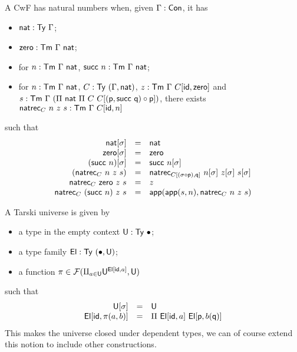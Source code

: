 A \acrshort{CwF} has natural numbers when, given \(\Gamma : \mathsf{Con}\), it has
\begin{itemize}
  \item \(\mathsf{nat} : \mathsf{Ty}\ \Gamma\);
  \item \(\czero : \CTm\ \Ga\ \nat\);
  \item for \(n : \mathsf{Tm}\ \Gamma\ \mathsf{nat}\), \(\mathsf{succ}\ n : \mathsf{Tm}\ \Gamma\ \mathsf{nat}\);
  \item for \(n : \mathsf{Tm}\ \Gamma\ \mathsf{nat}\), \(C : \mathsf{Ty}\ (\Gamma, \mathsf{nat})\),
  \(z : \mathsf{Tm}\ \Gamma\ C[\mathsf{id}, \mathsf{zero}]\) and
  \(s : \CTm\ \Ga\ (\Pi\ \nat\ \Pi\ C\ C[(\pp, \csucc\ \pq) \circ \pp])\),
  there exists \(\mathsf{natrec}_C\ n\ z\ s : \mathsf{Tm}\ \Gamma\ C[\mathsf{id}, n]\)
\end{itemize}
such that
\[
  \begin{array}{rcl}
    \nat[\sigma] &=& \nat \\
    \czero[\sigma] &=& \czero \\
    (\csucc\ n)[\sigma] &=& \csucc\ n[\sigma] \\
    (\natrec_C\ n\ z\ s) &=&
    \natrec_{C[(\sigma \circ \pp), \pq]}\ n[\sigma]\ z[\sigma]\ s[\sigma] \\
    \natrec_C\ \czero\ z\ s &=& z \\
    \natrec_C\ (\csucc\ n)\ z\ s &=& \capp(\capp(s,n), \natrec_C\ n\ z\ s)
  \end{array}
\]


A Tarski universe is given by
\begin{itemize}
  \item a type in the empty context \(\mathsf{U} : \mathsf{Ty}\ \bullet\);
  \item a type family \(\mathsf{El} : \mathsf{Ty}\ (\bullet, \mathsf{U})\);
  \item a function
  \(\pi \in \mathcal{F}(\amalg_{a \in \mathsf{U}} \mathsf{U}^{\mathsf{El}[\mathsf{id}, a]},\mathsf{U})\)
\end{itemize}
such that
\[
  \begin{array}{rcl}
    \mathsf{U}[\sigma] &=& \mathsf{U} \\
    \mathsf{El}[\mathsf{id}, \pi(a,b)] &=& \Pi\ \mathsf{El}[\mathsf{id}, a]\ \mathsf{El}[\mathsf{p}, b(\mathsf{q})]
  \end{array}
\]
This makes the universe closed under dependent types, we can of course extend
this notion to include other constructions.

